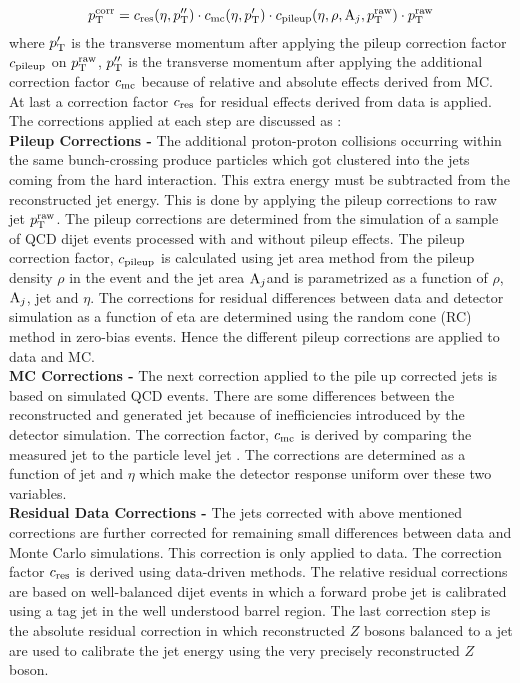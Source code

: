 \begin{equation}
p^{\rm corr}_{\rm T} = c_{\rm res}(\eta,p''_{\rm T})\cdot c_{\rm mc}(\eta,p'_{\rm T})\cdot c_{\rm pileup}(\eta,\rho,{\rm A}_{j},p^{\rm raw}_{\rm T})\cdot p^{\rm raw}_{\rm T}
\end{equation}
where $p'_{\rm T}$ is the transverse momentum after applying the pileup correction factor $c_{\rm pileup}$ on $p^{\rm raw}_{\rm T}$, $p''_{\rm T}$ is the transverse momentum after applying the additional correction factor $c_{\rm mc}$ because of relative and absolute effects derived from MC. At last a correction factor $c_{\rm res}$ for residual effects derived from data is applied. The corrections applied at each step are discussed as : \\\newline
{\bf Pileup Corrections -} The additional proton-proton collisions occurring within the same bunch-crossing produce particles which got clustered into the jets coming from the hard interaction. This extra energy must be subtracted from the reconstructed jet energy. This is done by applying the pileup corrections to raw jet $p^{\rm raw}_{\rm T}$. The pileup corrections are determined from the simulation of a sample of QCD dijet events processed with and without pileup effects. The pileup correction factor, $c_{\rm pileup}$ is calculated using jet area method from the pileup density $\rho$ in the event and the jet area ${\rm A}_{j}$and is parametrized as a function of $\rho$, ${\rm A}_{j}$, jet \pt and $\eta$. The corrections for residual differences between data and detector simulation as a function of eta are determined using the random cone (RC) method in zero-bias events. Hence the different pileup corrections are applied to data and MC. \\ \newline
{\bf MC Corrections -} The next correction applied to the pile up corrected jets is based on simulated QCD events. There are some differences between the reconstructed and generated jet \pt because of inefficiencies introduced by the detector simulation. The correction factor, $c_{\rm mc}$ is derived by comparing the measured jet \pt to the particle level jet \pt. The corrections are determined as a function of jet \pt and $\eta$ which make the detector response uniform over these two variables. \\ \newline
{\bf Residual Data Corrections -} The jets corrected with above mentioned corrections are further corrected for remaining small differences between data and Monte Carlo simulations. This correction is only applied to data. The correction factor $c_{\rm res}$ is derived using data-driven methods. The relative residual corrections are based on well-balanced dijet events in which a forward probe jet is calibrated using a tag jet in the well understood barrel region. The last correction step is the absolute residual correction in which reconstructed $Z$ bosons balanced to a jet are used to calibrate the jet energy using the very precisely reconstructed $Z$ boson. \\ \newline
